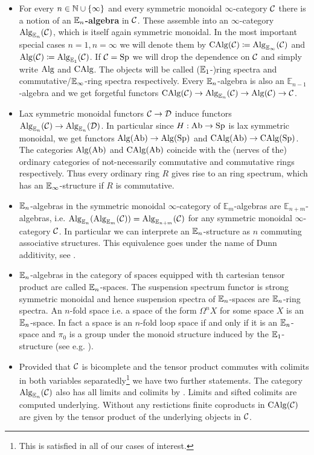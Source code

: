 \begin{itemize}
    \item For every $n\in\mathbb{N}\cup\{\infty\}$ and every symmetric monoidal $\infty$-category $\mathcal{C}$ there is a notion of an \textbf{$\mathbb{E}_n$-algebra} in $\mathcal{C}$. 
    These assemble into an $\infty$-category $\operatorname{Alg}_{\mathbb{E}_n}(\mathcal{C})$, which is itself again symmetric monoidal. 
    In the most important special cases $n=1,n=\infty$ we will denote them by $\operatorname{CAlg}(\mathcal{C})\coloneqq \operatorname{Alg}_{\mathbb{E}_\infty}(\mathcal{C})$ and $\operatorname{Alg}(\mathcal{C})\coloneqq \operatorname{Alg}_{\mathbb{E}_1}(\mathcal{C})$. If $\mathcal{C}=\operatorname{Sp}$ we will drop the dependence on $\mathcal{C}$ and simply write $\operatorname{Alg}$ and $\operatorname{CAlg}$. The objects will be called ($\mathbb{E}_1$-)ring spectra and commutative/$\mathbb{E}_\infty$-ring spectra respectively.
    Every $\mathbb{E}_n$-algebra is also an $\mathbb{E}_{n-1}$-algebra and we get forgetful functors $\operatorname{CAlg}(\mathcal{C})\rightarrow \operatorname{Alg}_{\mathbb{E}_n}(\mathcal{C})\rightarrow \operatorname{Alg}(\mathcal{C})\rightarrow \mathcal{C}$. 
    \item Lax symmetric monoidal functors $\mathcal{C}\rightarrow\mathcal{D}$ induce functors $\operatorname{Alg}_{\mathbb{E}_n}(\mathcal{C})\rightarrow \operatorname{Alg}_{\mathbb{E}_n}(\mathcal{D})$. In particular since $H:\operatorname{Ab}\rightarrow\operatorname{Sp}$ is lax symmetric monoidal, we get functors $\operatorname{Alg}(\operatorname{Ab})\rightarrow \operatorname{Alg}(\operatorname{Sp})$ and  $\operatorname{CAlg}(\operatorname{Ab})\rightarrow \operatorname{CAlg}(\operatorname{Sp})$. The categories $\operatorname{Alg}(\operatorname{Ab})$ and $\operatorname{CAlg}(\operatorname{Ab})$ coincide with the (nerves of the) ordinary categories of not-necessarily commutative and commutative rings respectively. Thus every ordinary ring $R$ gives rise to an ring spectrum, which has an $\mathbb{E}_\infty$-structure if $R$ is commutative.
    \item $\mathbb{E}_n$-algebras in the symmetric monoidal $\infty$-category of $\mathbb{E}_m$-algebras are $\mathbb{E}_{n+m}$-algebras, i.e. $\operatorname{Alg}_{\mathbb{E}_n}(\operatorname{Alg}_{\mathbb{E}_m}(\mathcal{C}))=\operatorname{Alg}_{\mathbb{E}_{n+m}}(\mathcal{C})$ for any symmetric monoidal $\infty$-category $\mathcal{C}$. In particular we can interprete an $\mathbb{E}_n$-structure as $n$ commuting associative structures. This equivalence goes under the name of Dunn additivity, see \cite[Theorem~5.1.2.2]{lurie2017higher}.
    \item $\mathbb{E}_n$-algebras in the category of spaces equipped with th cartesian tensor product are called $\mathbb{E}_n$-spaces. The suspension spectrum functor is strong symmetric monoidal and hence suspension spectra of $\mathbb{E}_n$-spaces are $\mathbb{E}_n$-ring spectra. An $n$-fold space i.e. a space of the form $\Omega^n X$ for some space $X$ is an $\mathbb{E}_n$-space. In fact a space is an $n$-fold loop space if and only if it is an $\mathbb{E}_n$-space and $\pi_0$ is a group under the monoid structure induced by the $\mathbb{E}_1$-structure (see e.g. \cite[Section~5.2.6]{lurie2017higher}).
    \item Provided that $\mathcal{C}$ is bicomplete and the tensor product commutes with colimits in both variables separatedly\footnote{This is satisfied in all of our cases of interest.} we have two further statements. The category $\operatorname{Alg}_{\mathbb{E}_n}(\mathcal{C})$ also has all limits and colimits by \cite[Section~3.2]{lurie2017higher}. Limits and sifted colimits are computed underlying. Without any restictions finite coproducts in $\operatorname{CAlg}(\mathcal{C})$ are given by the tensor product of the underlying objects in $\mathcal{C}$. 

\end{itemize}

